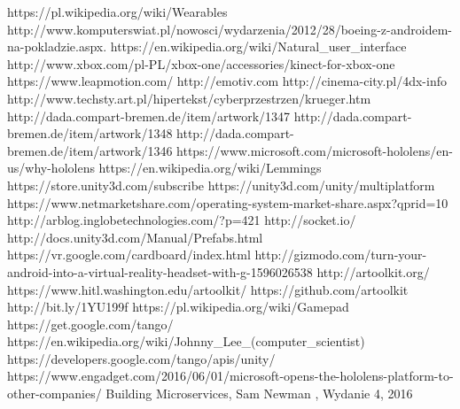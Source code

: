 \documentclass[inf, h]{pjatkThesis}
\begin{document}
\begin{thebibliography}{2}
 https://pl.wikipedia.org/wiki/Wearables
 http://www.komputerswiat.pl/nowosci/wydarzenia/2012/28/boeing-z-androidem-na-pokladzie.aspx.
 https://en.wikipedia.org/wiki/Natural\_user\_interface
 http://www.xbox.com/pl-PL/xbox-one/accessories/kinect-for-xbox-one
 https://www.leapmotion.com/
 http://emotiv.com
 http://cinema-city.pl/4dx-info
 http://www.techsty.art.pl/hipertekst/cyberprzestrzen/krueger.htm
 http://dada.compart-bremen.de/item/artwork/1347
 http://dada.compart-bremen.de/item/artwork/1348
 http://dada.compart-bremen.de/item/artwork/1346
 https://www.microsoft.com/microsoft-hololens/en-us/why-hololens
 https://en.wikipedia.org/wiki/Lemmings
 https://store.unity3d.com/subscribe
 https://unity3d.com/unity/multiplatform
 https://www.netmarketshare.com/operating-system-market-share.aspx?qprid=10
 http://arblog.inglobetechnologies.com/?p=421
 http://socket.io/
 http://docs.unity3d.com/Manual/Prefabs.html
 https://vr.google.com/cardboard/index.html
 http://gizmodo.com/turn-your-android-into-a-virtual-reality-headset-with-g-1596026538
 http://artoolkit.org/
 https://www.hitl.washington.edu/artoolkit/
 https://github.com/artoolkit
 http://bit.ly/1YU199f
 https://pl.wikipedia.org/wiki/Gamepad
 https://get.google.com/tango/
 https://en.wikipedia.org/wiki/Johnny\_Lee\_(computer\_scientist)
 https://developers.google.com/tango/apis/unity/
 https://www.engadget.com/2016/06/01/microsoft-opens-the-hololens-platform-to-other-companies/
 Building Microservices,  Sam Newman , Wydanie 4, 2016
\end{thebibliography}

    
\end{document}
